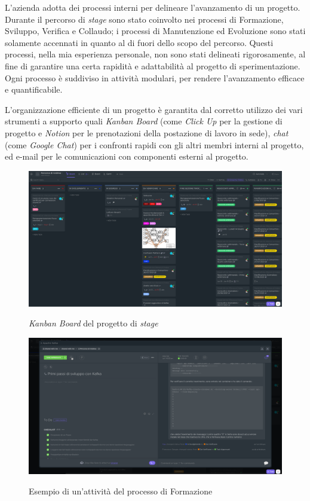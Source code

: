 
L'azienda adotta dei processi interni per delineare l'avanzamento di un progetto.
Durante il percorso di \textit{stage} sono stato coinvolto nei processi di Formazione, Sviluppo, Verifica e Collaudo; i processi di Manutenzione ed Evoluzione sono stati solamente accennati in quanto al di fuori dello scopo del percorso.
Questi processi, nella mia esperienza personale, non sono stati delineati rigorosamente, al fine di garantire una certa rapidità e adattabilità al progetto di sperimentazione.
Ogni processo è suddiviso in attività modulari, per rendere l'avanzamento efficace e quantificabile.

L'organizzazione efficiente di un progetto è garantita dal corretto utilizzo dei vari strumenti a supporto quali \textit{Kanban Board} (come \textit{Click Up} per la gestione di progetto e \textit{Notion} per le prenotazioni della postazione di lavoro in sede), \textit{chat} (come \textit{Google Chat}) per i confronti rapidi con gli altri membri interni al progetto, ed e-mail per le comunicazioni con componenti esterni al progetto.

\bigskip
\begin{figure}[h]
  \includegraphics[width=\textwidth]{images/clickup_board.png}\\
  \caption{\textit{Kanban Board} del progetto di \textit{stage}}
\end{figure}
\begin{figure}[h!]
  \includegraphics[width=\textwidth]{images/clickup_task.png}\\
  \caption{Esempio di un'attività del processo di Formazione}
\end{figure}

